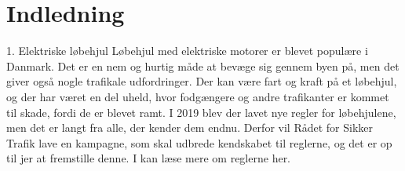 \chapter{Indledning}
1. Elektriske løbehjul Løbehjul med elektriske motorer er blevet populære i Danmark. Det er en nem og hurtig måde at bevæge sig gennem byen på, 
men det giver også nogle trafikale udfordringer. Der kan være fart og kraft på et løbehjul, og der har været en del uheld, hvor fodgængere og andre 
trafikanter er kommet til skade, fordi de er blevet ramt. I 2019 blev der lavet nye regler for løbehjulene, men det er langt fra alle, der kender dem endnu. 
Derfor vil Rådet for Sikker Trafik lave en kampagne, som skal udbrede kendskabet til reglerne, og det er op til jer at fremstille denne. 
I    kan læse mere om reglerne her. 